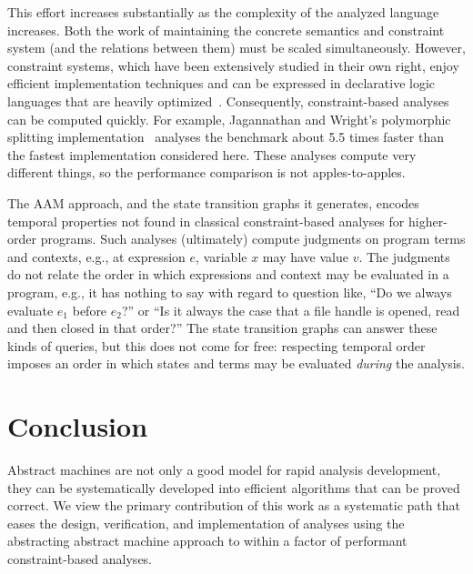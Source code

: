 \documentclass[preprint,onecolumn,9pt]{sigplanconf} %
\begin{document}
This effort increases substantially as the complexity of the analyzed
language increases.  Both the work of maintaining the concrete
semantics and constraint system (and the relations between them) must
be scaled simultaneously.  However, constraint systems, which have
been extensively studied in their own right, enjoy efficient
implementation techniques and can be expressed in declarative logic
languages that are heavily
optimized~\cite{dvanhorn:bravenboer-smaragdakis-oopsla09}.
Consequently, constraint-based analyses can be computed quickly.  For
example, Jagannathan and Wright's polymorphic splitting
implementation~\cite{dvanhorn:wright-jagannathan-toplas98} analyses
the \Church{} benchmark about 5.5 times faster than the fastest
implementation considered here.  These analyses compute very different
things, so the performance comparison is not apples-to-apples.

The AAM approach, and the state transition graphs it generates, encodes
temporal properties not found in classical constraint-based analyses
for higher-order programs.
%
Such analyses (ultimately) compute judgments on program terms and
contexts, e.g., at expression $e$, variable $x$ may have value $v$.
%
The judgments do not relate the order in which expressions and context
may be evaluated in a program, e.g., it has nothing
to say with regard to question like, ``Do we always evaluate $e_1$
before $e_2$?'' or ``Is it always the case that a file handle is
opened, read and then closed in that order?''
%
The state transition graphs can answer these kinds of queries, but
this does not come for free: respecting temporal order imposes an
order in which states and terms may be evaluated \emph{during} the
analysis.

\section{Conclusion}
\label{sec:conclusion}

Abstract machines are not only a good model for rapid analysis
development, they can be systematically developed into efficient
algorithms that can be proved correct. We view the primary
contribution of this work as a systematic path that eases the design,
verification, and implementation of analyses using the abstracting
abstract machine approach to within a factor of performant
constraint-based analyses.

\end{document}
